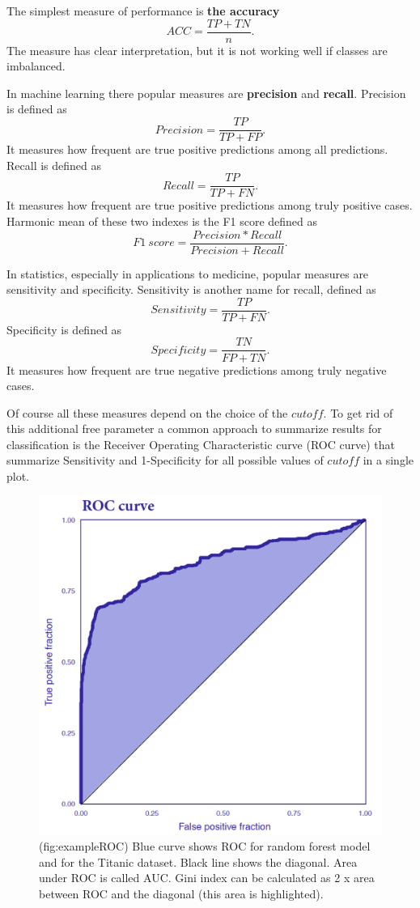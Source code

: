\documentclass[12pt,]{krantz}
\begin{document}
The simplest measure of performance is \textbf{the accuracy}
\[
ACC = \frac{TP+TN}{n}.
\]
The measure has clear interpretation, but it is not working well if classes are imbalanced.

In machine learning there popular measures are \textbf{precision} and \textbf{recall}. Precision is defined as\\
\[
Precision = \frac{TP}{TP + FP}.
\]
It measures how frequent are true positive predictions among all predictions. Recall is defined as
\[
Recall = \frac{TP}{TP + FN}.
\]
It measures how frequent are true positive predictions among truly positive cases. Harmonic mean of these two indexes is the F1 score defined as
\[
F1\  score = \frac{Precision * Recall}{Precision + Recall}.
\]

In statistics, especially in applications to medicine, popular measures are sensitivity and specificity. Sensitivity is another name for recall, defined as
\[
Sensitivity = \frac{TP}{TP + FN}.
\]
Specificity is defined as
\[
Specificity = \frac{TN}{FP + TN}.
\]
It measures how frequent are true negative predictions among truly negative cases.

Of course all these measures depend on the choice of the \(cutoff\). To get rid of this additional free parameter a common approach to summarize results for classification is the Receiver Operating Characteristic curve (ROC curve) that summarize Sensitivity and 1-Specificity for all possible values of \(cutoff\) in a single plot.

\begin{figure}

{\centering \includegraphics[width=0.8\linewidth]{figure/ROCcurve} 

}

\caption{(fig:exampleROC) Blue curve shows ROC for random forest model and for the Titanic dataset. Black line shows the diagonal. Area under ROC is called AUC. Gini index can be calculated as 2 x area between ROC and the diagonal (this area is highlighted).}\label{fig:exampleROC}
\end{figure}
\end{document}
